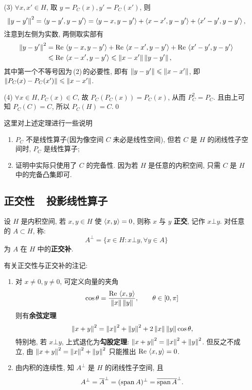 \begin{Proof}
	(3) $ \forall x, x'\in H $, 取 $ y=P_{C}(x), y'=P_{C}(x') $, 则
	\[
		\left\| y-y' \right\|^{2}=\left\langle y-y', y-y' \right\rangle=\left\langle y-x, y-y' \right\rangle+\left\langle x-x', y-y' \right\rangle+\left\langle x'-y', y-y' \right\rangle,
	\]
	注意到左侧为实数, 两侧取实部有
	\[
		\begin{aligned}
			\left\| y-y' \right\|^{2} & =\mathrm{Re\,}\left\langle y-x, y-y' \right\rangle+\mathrm{Re\,}\left\langle x-x', y-y' \right\rangle+\mathrm{Re\,}\left\langle x'-y', y-y' \right\rangle \\
			                & \leqslant \mathrm{Re\,}\left\langle x-x', y-y' \right\rangle\leqslant \left\| x-x' \right\|\left\| y-y' \right\|,
		\end{aligned}
	\]
	其中第一个不等号因为\,(2)\,的必要性, 即有 $ \left\| y-y' \right\|\leqslant\left\| x-x' \right\| $, 即 $ \left\| P_{C}(x)-P_{C}(x') \right\|\leqslant \left\| x-x' \right\| $.

	(4) $ \forall x\in H, P_{C}(x)\in C $, 故 $ P_{C}(P_{C}(x))=P_{C}(x) $, 从而 $ P_{C}^{2}=P_{C} $. 且由上可知 $ P_{C}(C)=C $, 所以 $ P_{C}(H)=C $.\qed
\end{Proof}

\begin{Remark}
	这里对上述定理进行一些说明
	\begin{enumerate}[(1)]
		\item $ P_{C} $ 不是线性算子(因为像空间 $ C $ 未必是线性空间), 但若 $ C $ 是 $ H $ 的闭线性子空间时, $ P_{C} $ 是线性算子;
		\item 证明中实际只使用了 $ C $ 的完备性. 因为若 $ H $ 是任意的内积空间, 只需 $ C $ 是 $ H $ 中的完备凸集即可.
	\end{enumerate}
\end{Remark}

\subsection{正交性\ \ 投影线性算子}

\begin{Definition}[正交, 正交补]\label{def:正交, 正交补}
	设 $ H $ 是内积空间,  若 $ x, y\in H $ 使 $ \left\langle x, y \right\rangle=0 $, 则称 $ x $ 与 $ y $ \textbf{正交}, 记作 $ x\bot y $. 对任意的 $ A\subset H $, 称:
	\[
		A^{\bot}=\{ x\in H: x\bot y, \forall y\in A \}
	\]
	为 $ A $ 在 $ H $ 中的\textbf{正交补}.
\end{Definition}

\begin{Remark}\label{rmk:正交性与正交补}
	有关正交性与正交补的注记:
	\begin{enumerate}[(1)]
		\item 对 $ x\ne0, y\ne 0 $, 可定义向量的夹角
		      \[
			      \cos\theta=\frac{\mathrm{Re\,}\left\langle x, y \right\rangle}{\left\| x \right\|\left\| y \right\|},\qquad \theta\in[0, \pi]
		      \]
		      则有\textbf{余弦定理}
		      \[
			      \left\| x+y \right\|^{2}=\left\| x \right\|^{2}+\left\| y \right\|^{2}+2\left\| x \right\|\left\| y \right\|\cos\theta,
		      \]
		      特别地, 若 $ x\bot y $, 上式退化为\textbf{勾股定理}: $ \left\| x+y \right\|^{2}=\left\| x \right\|^{2}+\left\| y \right\|^{2} $. 但反之不成立, 由 $ \left\| x+y \right\|^{2}=\left\| x \right\|^{2}+\left\| y \right\|^{2} $ 只能推出 $ \mathrm{Re\,}\left\langle x, y \right\rangle= 0 $.
		\item 由内积的连续性, 知 $ A^{\bot} $ 是 $ H $ 的闭线性子空间, 且
		      \[
			      A^{\bot}=\overline{A}^{\bot}=(\operatorname{span} A)^{\bot}=\overline{\operatorname{span} A}^{\bot}.
		      \]
	\end{enumerate}
\end{Remark}

